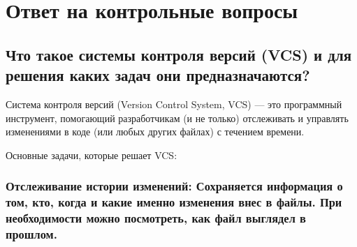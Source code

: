 \documentclass[
  english,
  russian,
  12pt,
  a4paper,
  DIV=11,
  numbers=noendperiod]{scrreprt}
\begin{document}
\chapter{Ответ на контрольные
вопросы}\label{ux43eux442ux432ux435ux442-ux43dux430-ux43aux43eux43dux442ux440ux43eux43bux44cux43dux44bux435-ux432ux43eux43fux440ux43eux441ux44b}

\section{Что такое системы контроля версий (VCS) и для решения каких
задач они
предназначаются?}\label{ux447ux442ux43e-ux442ux430ux43aux43eux435-ux441ux438ux441ux442ux435ux43cux44b-ux43aux43eux43dux442ux440ux43eux43bux44f-ux432ux435ux440ux441ux438ux439-vcs-ux438-ux434ux43bux44f-ux440ux435ux448ux435ux43dux438ux44f-ux43aux430ux43aux438ux445-ux437ux430ux434ux430ux447-ux43eux43dux438-ux43fux440ux435ux434ux43dux430ux437ux43dux430ux447ux430ux44eux442ux441ux44f}

Система контроля версий (Version Control System, VCS) --- это
программный инструмент, помогающий разработчикам (и не только)
отслеживать и управлять изменениями в коде (или любых других файлах) с
течением времени.

Основные задачи, которые решает VCS:

\subsection{Отслеживание истории изменений: Сохраняется информация о
том, кто, когда и какие именно изменения внес в файлы. При необходимости
можно посмотреть, как файл выглядел в
прошлом.}\label{ux43eux442ux441ux43bux435ux436ux438ux432ux430ux43dux438ux435-ux438ux441ux442ux43eux440ux438ux438-ux438ux437ux43cux435ux43dux435ux43dux438ux439-ux441ux43eux445ux440ux430ux43dux44fux435ux442ux441ux44f-ux438ux43dux444ux43eux440ux43cux430ux446ux438ux44f-ux43e-ux442ux43eux43c-ux43aux442ux43e-ux43aux43eux433ux434ux430-ux438-ux43aux430ux43aux438ux435-ux438ux43cux435ux43dux43dux43e-ux438ux437ux43cux435ux43dux435ux43dux438ux44f-ux432ux43dux435ux441-ux432-ux444ux430ux439ux43bux44b.-ux43fux440ux438-ux43dux435ux43eux431ux445ux43eux434ux438ux43cux43eux441ux442ux438-ux43cux43eux436ux43dux43e-ux43fux43eux441ux43cux43eux442ux440ux435ux442ux44c-ux43aux430ux43a-ux444ux430ux439ux43b-ux432ux44bux433ux43bux44fux434ux435ux43b-ux432-ux43fux440ux43eux448ux43bux43eux43c.}
\end{document}
